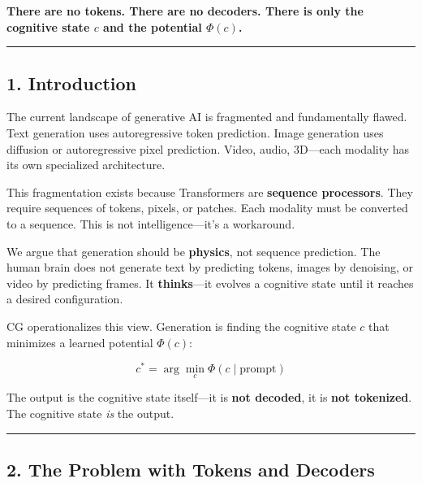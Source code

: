 \documentclass[
  11pt,
  a4paper,
]{article}
\begin{document}
\textbf{There are no tokens. There are no decoders. There is only the
cognitive state \(c\) and the potential \(\Phi(c)\).}

\begin{center}\rule{0.5\linewidth}{0.5pt}\end{center}

\subsection{1. Introduction}\label{introduction}

The current landscape of generative AI is fragmented and fundamentally
flawed. Text generation uses autoregressive token prediction. Image
generation uses diffusion or autoregressive pixel prediction. Video,
audio, 3D---each modality has its own specialized architecture.

This fragmentation exists because Transformers are \textbf{sequence
processors}. They require sequences of tokens, pixels, or patches. Each
modality must be converted to a sequence. This is not
intelligence---it's a workaround.

We argue that generation should be \textbf{physics}, not sequence
prediction. The human brain does not generate text by predicting tokens,
images by denoising, or video by predicting frames. It
\textbf{thinks}---it evolves a cognitive state until it reaches a
desired configuration.

CG operationalizes this view. Generation is finding the cognitive state
\(c\) that minimizes a learned potential \(\Phi(c)\):

\[
c^* = \arg\min_{c} \Phi(c \mid \text{prompt})
\]

The output is the cognitive state itself---it is \textbf{not decoded},
it is \textbf{not tokenized}. The cognitive state \emph{is} the output.

\begin{center}\rule{0.5\linewidth}{0.5pt}\end{center}

\subsection{2. The Problem with Tokens and
Decoders}\label{the-problem-with-tokens-and-decoders}
\end{document}
